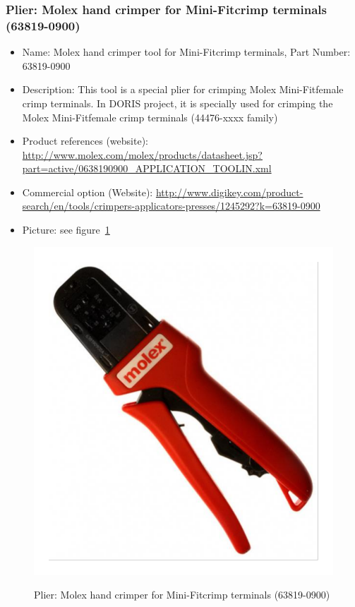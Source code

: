 \subsubsection{Plier: Molex hand crimper for Mini-Fit\textregistered crimp terminals (63819-0900)} \label{DEVICE:TOOLCRIMPERmini}
\begin{itemize}
\item Name: Molex hand crimper tool for Mini-Fit\textregistered crimp terminals, Part Number: 63819-0900
  \item Description: This tool is a special plier for crimping Molex Mini-Fit\textregistered female crimp terminals. In DORIS project, it is specially used for crimping the Molex Mini-Fit\textregistered female crimp terminals (44476-xxxx family)
  \item Product references (website): \href{http://www.molex.com/molex/products/datasheet.jsp?part=active/0638190900\_APPLICATION\_TOOLIN.xml}{http://www.molex.com/molex/products/datasheet.jsp?part=active/0638190900\_APPLICATION\_TOOLIN.xml}
  \item Commercial option (Website): \href{http://www.digikey.com/product-search/en/tools/crimpers-applicators-presses/1245292?k=63819-0900}{http://www.digikey.com/product-search/en/tools/crimpers-applicators-presses/1245292?k=63819-0900}
  \item Picture: see figure~\ref{FIG:DEVICECRIMPERmini}
\end{itemize}
\begin{figure}
  \centering
  \includegraphics[angle=90,width=1\columnwidth]{figs/body02/FIGDEVICECRIMPERmini.pdf}\\
  \caption[Plier: Molex hand crimper for Mini-Fit\textregistered crimp terminals (63819-0900)]{Plier: Molex hand crimper for Mini-Fit\textregistered crimp terminals (63819-0900)}
  \label{FIG:DEVICECRIMPERmini}
\end{figure}
